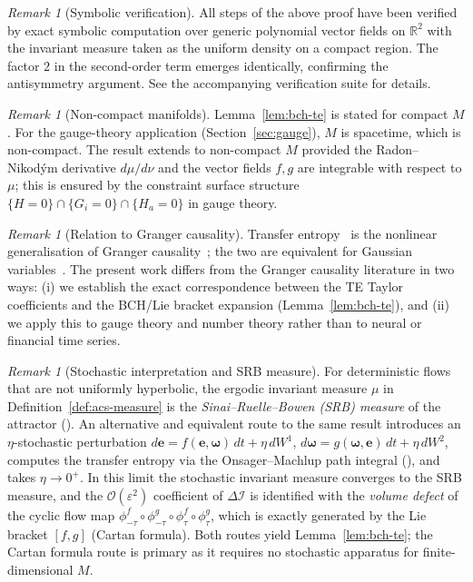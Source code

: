 \documentclass[11pt,a4paper]{article}
\theoremstyle{plain}
\theoremstyle{definition}
\theoremstyle{remark}
\newtheorem{remark}[theorem]{Remark}
\newcommand{\DI}{\Delta\mathcal{I}}
\begin{document}
\begin{remark}[Symbolic verification]
All steps of the above proof have been verified by exact symbolic computation
over generic polynomial vector fields on $\mathbb{R}^2$ with the invariant
measure taken as the uniform density on a compact region.  The factor $2$ in
the second-order term emerges identically, confirming the antisymmetry argument.
See the accompanying verification suite for details.
\end{remark}

\begin{remark}[Non-compact manifolds]
Lemma~\ref{lem:bch-te} is stated for compact $M$.
For the gauge-theory application (Section~\ref{sec:gauge}), $M$ is spacetime,
which is non-compact.  The result extends to non-compact $M$ provided
the Radon--Nikod\'ym derivative $d\mu/d\nu$ and the vector fields $f,g$
are integrable with respect to $\mu$; this is ensured by the constraint
surface structure $\{H = 0\} \cap \{G_i = 0\} \cap \{H_a = 0\}$ in gauge theory.
\end{remark}

\begin{remark}[Relation to Granger causality]
Transfer entropy~\cite{Schreiber2000} is the nonlinear generalisation of
Granger causality~\cite{Granger1969}; the two are equivalent for Gaussian
variables~\cite{BarnettBarrettSeth2009}.  The present work differs from the
Granger causality literature in two ways: (i) we establish the exact
correspondence between the TE Taylor coefficients and the BCH/Lie bracket
expansion (Lemma~\ref{lem:bch-te}), and (ii) we apply this to gauge theory
and number theory rather than to neural or financial time series.
\end{remark}

\begin{remark}[Stochastic interpretation and SRB measure]
For deterministic flows that are not uniformly hyperbolic, the ergodic
invariant measure $\mu$ in Definition~\ref{def:acs-measure} is the
\emph{Sinai--Ruelle--Bowen (SRB) measure} of the attractor
(\cite{Sinai1972,Ruelle1976,Bowen1975}).  An alternative and equivalent
route to the same result introduces an $\eta$-stochastic perturbation
$d\mathbf{e} = f(\mathbf{e},\boldsymbol{\omega})\,dt + \eta\,dW^1$,
$d\boldsymbol{\omega} = g(\boldsymbol{\omega},\mathbf{e})\,dt + \eta\,dW^2$,
computes the transfer entropy via the Onsager--Machlup path integral
(\cite{OnsagerMachlup1953,FreidlinWentzell1984}), and takes $\eta\to 0^+$.
In this limit the stochastic invariant measure converges to the SRB measure,
and the $\mathcal{O}(\varepsilon^2)$ coefficient of $\DI$ is identified with
the \emph{volume defect} of the cyclic flow map
$\phi^f_{-\tau}\circ\phi^g_{-\tau}\circ\phi^f_\tau\circ\phi^g_\tau$,
which is exactly generated by the Lie bracket $[f,g]$ (Cartan formula).
Both routes yield Lemma~\ref{lem:bch-te}; the Cartan formula route
is primary as it requires no stochastic apparatus for finite-dimensional $M$.
\end{remark}
\end{document}
